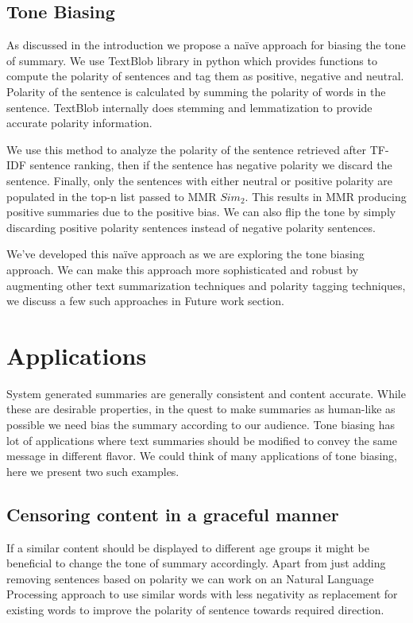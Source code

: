 \documentclass[conference]{IEEEtran}
\begin{document}
\subsection{Tone Biasing}
As discussed in the introduction we propose a naïve approach for biasing the tone of summary. We use TextBlob library in python which provides functions to compute the polarity of sentences and tag them as positive, negative and neutral. Polarity of the sentence is calculated by summing the polarity of words in the sentence. TextBlob internally does stemming and lemmatization to provide accurate polarity information.
\par
We use this method to analyze the polarity of the sentence retrieved after TF-IDF sentence ranking, then if the sentence has negative polarity we discard the sentence. Finally, only the sentences with either neutral or positive polarity are populated in the top-n list passed to MMR $Sim_2$. This results in MMR producing positive summaries due to the positive bias. We can also flip the tone by simply discarding positive polarity sentences instead of negative polarity sentences.
\par
We\rq ve developed this naïve approach as we are exploring the tone biasing approach. We can make this approach more sophisticated and robust by augmenting other text summarization techniques and polarity tagging techniques, we discuss a few such approaches in Future work section. 



\section{Applications}
System generated summaries are generally consistent and content accurate. While these are desirable properties, in the quest to make summaries as human-like as possible we need bias the summary according to our audience. Tone biasing has lot of applications where text summaries should be modified to convey the same message in different flavor. We could think of many applications of tone biasing, here we present two such examples.
\subsection*{Censoring content in a graceful manner}
If a similar content should be displayed to different age groups it might be beneficial to change the tone of summary accordingly. Apart from just adding removing sentences based on polarity we can work on an Natural Language Processing approach to use similar words with less negativity as replacement for existing words to improve the polarity of sentence towards required direction.
\end{document}
